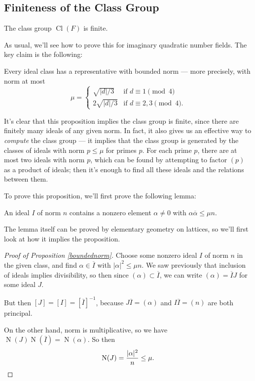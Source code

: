\subsection{Finiteness of the Class Group}

\vspace{0.75em}

\begin{theorem}
The class group $\operatorname{Cl}(F)$ is finite. 
\end{theorem}

As usual, we'll see how to prove this for imaginary quadratic number fields. The key claim is the following:

\begin{proposition}\label{boundednorm}
    Every ideal class has a representative with bounded norm --- more precisely, with norm at most \[\mu = \begin{cases} \sqrt{|d|/3} & \text{if } d \equiv 1 \pmod{4} \\ 2\sqrt{|d|/3} & \text{if } d \equiv 2, 3 \pmod{4}.\end{cases}\] 
\end{proposition}

It's clear that this proposition implies the class group is finite, since there are finitely many ideals of any given norm. In fact, it also gives us an effective way to \emph{compute} the class group --- it implies that the class group is generated by the classes of ideals with norm $p \leq \mu$ for primes $p$. For each prime $p$, there are at most two ideals with norm $p$, which can be found by attempting to factor $(p)$ as a product of ideals; then it's enough to find all these ideals and the relations between them. 

To prove this proposition, we'll first prove the following lemma:

\begin{lemma}\label{geolemma}
    An ideal $I$ of norm $n$ contains a nonzero element $\alpha \neq 0$ with $\alpha\overline{\alpha} \leq \mu n$. 
\end{lemma}

The lemma itself can be proved by elementary geometry on lattices, so we'll first look at how it implies the proposition. 

\begin{proof}[Proof of Proposition \ref{boundednorm}]
Choose some nonzero ideal $I$ of norm $n$ in the given class, and find $\alpha \in \overline{I}$ with $|\alpha|^2 \leq \mu n$. We saw previously that inclusion of ideals implies divisibility, so then since $(\alpha) \subset \overline{I}$, we can write $(\alpha) = \overline{I}J$ for some ideal $J$. 

But then $[J] = [I] = [\overline{I}]^{-1}$, because $J\overline{I} = (\alpha)$ and $I\overline{I} = (n)$ are both principal. 

On the other hand, norm is multiplicative, so we have $\operatorname{N}(J)\operatorname{N}(\overline{I}) = \operatorname{N}(\alpha)$. So then \[\operatorname{N}(J) = \frac{|\alpha|^2}{n} \leq \mu. \qedhere\] 
\end{proof}


